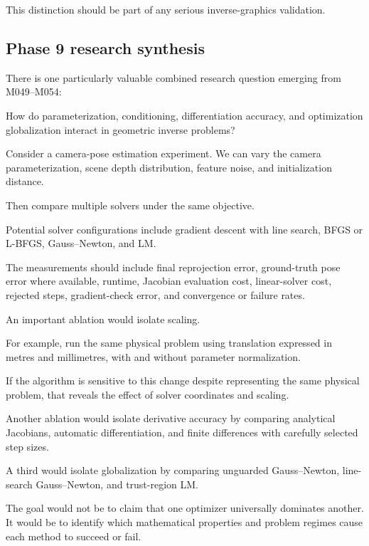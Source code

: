 This distinction should be part of any serious inverse-graphics validation.

\subsection{Phase 9 research synthesis}\label{02-foundations-ii-ch028-phase-9-research-synthesis}

\hypertarget{02-foundations-ii-ch028-phase-9-research-synthesis}{}

There is one particularly valuable combined research question emerging from M049--M054:

How do parameterization, conditioning, differentiation accuracy, and optimization globalization interact in geometric inverse problems?

Consider a camera-pose estimation experiment. We can vary the camera parameterization, scene depth distribution, feature noise, and initialization distance.

Then compare multiple solvers under the same objective.

Potential solver configurations include gradient descent with line search, BFGS or L-BFGS, Gauss--Newton, and LM.

The measurements should include final reprojection error, ground-truth pose error where available, runtime, Jacobian evaluation cost, linear-solver cost, rejected steps, gradient-check error, and convergence or failure rates.

An important ablation would isolate scaling.

For example, run the same physical problem using translation expressed in metres and millimetres, with and without parameter normalization.

If the algorithm is sensitive to this change despite representing the same physical problem, that reveals the effect of solver coordinates and scaling.

Another ablation would isolate derivative accuracy by comparing analytical Jacobians, automatic differentiation, and finite differences with carefully selected step sizes.

A third would isolate globalization by comparing unguarded Gauss--Newton, line-search Gauss--Newton, and trust-region LM.

The goal would not be to claim that one optimizer universally dominates another. It would be to identify which mathematical properties and problem regimes cause each method to succeed or fail.

